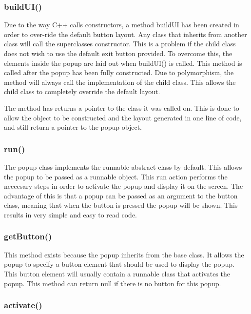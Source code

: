 \subsubsection{buildUI()}

Due to the way C++ calls constructors, a method buildUI has been created in order to over-ride the default button layout. Any class that inherits from another class will call the superclasses constructor. This is a problem if the child class does not wish to use the default exit button provided. To overcome this, the elements inside the popup are laid out when buildUI() is called. This method is called after the popup has been fully constructed. Due to polymorphism, the method will always call the implementation of the child class. This allows the child class to completely override the default layout.

The method has returns a pointer to the class it was called on. This is done to allow the object to be constructed and the layout generated in one line of code, and still return a pointer to the popup object.

\subsubsection{run()}

The popup class implements the runnable abstract class by default. This allows the popup to be passed as a runnable object. This run action performs the neccesary steps in order to activate the popup and display it on the screen. The advantage of this is that a popup can be passed as an argument to the button class, meaning that when the button is pressed the popup will be shown. This results in very simple and easy to read code.

\subsubsection{getButton()}

This method exists because the popup inherits from the base class. It allows the popup to specify a button element that should be used to display the popup. This button element will usually contain a runnable class that activates the popup. This method can return null if there is no button for this popup.

\subsubsection{activate()}


